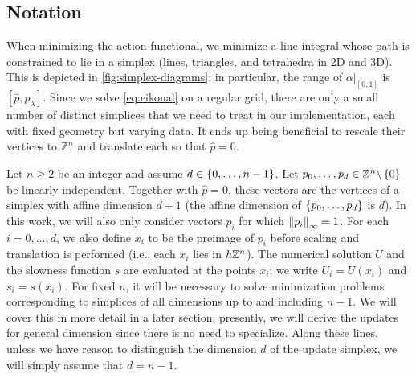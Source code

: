 \documentclass[sisc-eikonal.tex]{subfiles}
\begin{document}
\subsection{Notation}

When minimizing the action functional, we minimize a line integral
whose path is constrained to lie in a simplex (lines, triangles, and
tetrahedra in 2D and 3D). This is depicted in
\cref{fig:simplex-diagrams}; in particular, the range of
$\left. \alpha \right|_{[0, 1]}$ is $[\hat{p}, p_{\lambda}]$. Since we
solve \cref{eq:eikonal} on a regular grid, there are only a small
number of distinct simplices that we need to treat in our
implementation, each with fixed geometry but varying data. It ends up
being beneficial to rescale their vertices to $\mathbb{Z}^n$ and
translate each so that $\hat{p} = 0$.

Let $n \geq 2$ be an integer and assume
$d \in \left\{0, \hdots, n - 1\right\}$. Let
$p_0, \hdots, p_d \in \mathbb{Z}^n \backslash \left\{0\right\}$ be linearly
independent. Together with $\hat{p} = 0$, these vectors are the
vertices of a simplex with affine dimension $d + 1$ (the affine
dimension of $\left\{p_0, \hdots, p_d\right\}$ is $d$). In this work, we will
also only consider vectors $p_i$ for which $\left\|p_i\right\|_\infty =
1$. For each $i = 0, \hdots, d$, we also define $x_i$ to be the
preimage of $p_i$ before scaling and translation is performed (i.e.,
each $x_i$ lies in $h \mathbb{Z}^n$). The numerical solution $U$ and the
slowness function $s$ are evaluated at the points $x_i$; we write
$U_i = U(x_i)$ and $s_i = s(x_i)$. For fixed $n$, it will be necessary
to solve minimization problems corresponding to simplices of all
dimensions up to and including $n - 1$. We will cover this in more
detail in a later section; presently, we will derive the updates for
general dimension since there is no need to specialize. Along these
lines, unless we have reason to distinguish the dimension $d$ of the
update simplex, we will simply assume that $d = n - 1$.
\end{document}
